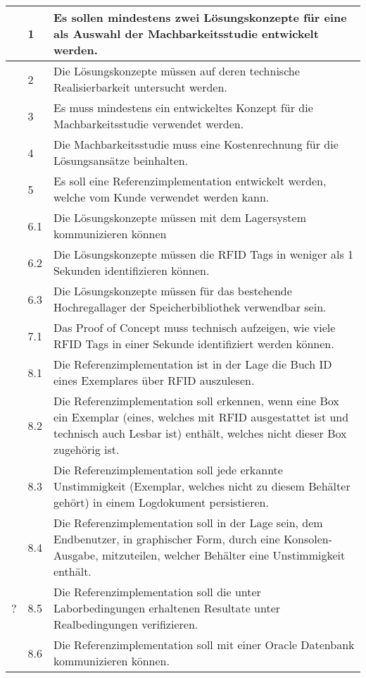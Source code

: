 \begin{tabularx}{\textwidth}{l l X}
	\hline
	\checkmark & 1   & Es sollen mindestens zwei Lösungskonzepte für eine als Auswahl der Machbarkeitsstudie entwickelt werden. \\
	\hline
	\checkmark & 2   & Die Lösungskonzepte müssen auf deren technische Realisierbarkeit untersucht werden. \\
	\hline
	\checkmark & 3   & Es muss mindestens ein entwickeltes Konzept für die Machbarkeitsstudie verwendet werden. \\
	\hline
	\checkmark & 4   & Die Machbarkeitsstudie muss eine Kostenrechnung für die Lösungsansätze beinhalten. \\
	\hline
	\checkmark & 5   & Es soll eine Referenzimplementation entwickelt werden, welche vom Kunde verwendet werden kann. \\
	\hline
	\checkmark & 6.1 & Die Lösungskonzepte müssen mit dem Lagersystem kommunizieren können \\
	\hline
	\checkmark & 6.2 & Die Lösungskonzepte müssen die RFID Tags in weniger als 1 Sekunden identifizieren können. \\
	\hline
	\checkmark & 6.3 & Die Lösungskonzepte müssen für das bestehende Hochregallager der Speicherbibliothek verwendbar sein. \\
	\hline
	\checkmark & 7.1 & Das Proof of Concept muss technisch aufzeigen, wie viele RFID Tags in einer Sekunde identifiziert werden können. \\
	\hline
	\checkmark & 8.1 & Die Referenzimplementation ist in der Lage die Buch ID eines Exemplares über RFID auszulesen. \\
	\hline
	\checkmark & 8.2 & Die Referenzimplementation soll erkennen, wenn eine Box ein Exemplar (eines, welches mit RFID ausgestattet ist und technisch auch Lesbar ist) enthält, welches nicht dieser Box zugehörig ist. \\
	\hline
	\checkmark & 8.3 & Die Referenzimplementation soll jede erkannte Unstimmigkeit (Exemplar, welches nicht zu diesem Behälter gehört) in einem Logdokument persistieren. \\
	\hline
	\checkmark & 8.4 & Die Referenzimplementation soll in der Lage sein, dem Endbenutzer, in graphischer Form, durch eine Konsolen-Ausgabe, mitzuteilen, welcher Behälter eine Unstimmigkeit enthält. \\
	\hline
	? & 8.5 & Die Referenzimplementation soll die unter Laborbedingungen erhaltenen Resultate unter Realbedingungen verifizieren. \\
	\hline
	\notmark & 8.6 & Die Referenzimplementation soll mit einer Oracle Datenbank kommunizieren können. \\
	\hline
\end{tabularx}

